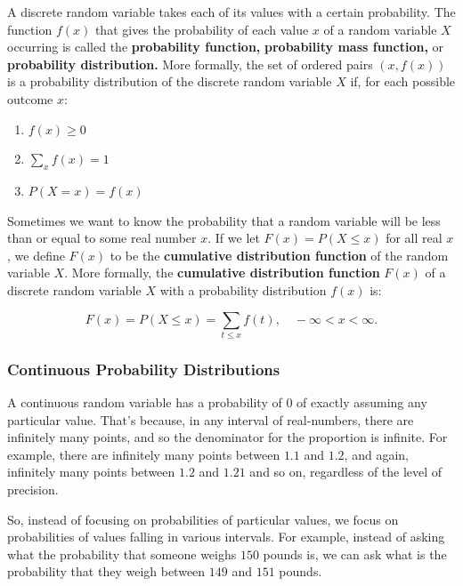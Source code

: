 \documentclass{article}
\begin{document}
\begin{definition}
A \@{discrete random variable} takes each of its values with a certain \@{probability}. The \@{function} $f(x)$ that gives the probability of each value $x$ of a \@{random variable} $X$ occurring is called the \textbf{probability function,} \textbf{probability mass function,} or \textbf{probability distribution.} More formally, the set of ordered pairs $(x, f(x))$ is a probability distribution of the discrete random variable $X$ if, for each possible outcome $x$:

\begin{enumerate}
\item $f(x) \geq 0$
\item $\sum_{x}{f(x)} = 1$
\item $P(X = x) = f(x)$
\end{enumerate}
\end{definition}

\begin{definition}
Sometimes we want to know the \@{probability} that a \@{random variable} will be less than or equal to some \@{real number} $x.$ If we let $F(x) = P(X \leq x)$ for all real $x$, we define $F(x)$ to be the \textbf{cumulative distribution function} of the random variable $X.$ More formally, the \textbf{cumulative distribution function} $F(x)$ of a \@{discrete random variable} $X$ with a \@{probability distribution} $f(x)$ is:

\[ F(x) = P(X \leq x) = \sum_{t \leq x}{f(t)}, \quad -\infty < x < \infty. \]
\end{definition}

\subsubsection{Continuous Probability Distributions}

A \@{continuous random variable} has a \@{probability} of $0$ of exactly assuming any particular value. That's because, in any \@{interval} of \@{real-numbers}, there are infinitely many points, and so the denominator for the proportion is infinite. For example, there are infinitely many points between $1.1$ and $1.2$, and again, infinitely many points between $1.2$ and $1.21$ and so on, regardless of the level of precision.

So, instead of focusing on \@{probabilities} of particular values, we focus on probabilities of values falling in various \@{intervals}. For example, instead of asking what the probability that someone weighs $150$ pounds is, we can ask what is the probability that they weigh between $149$ and $151$ pounds.
\end{document}

